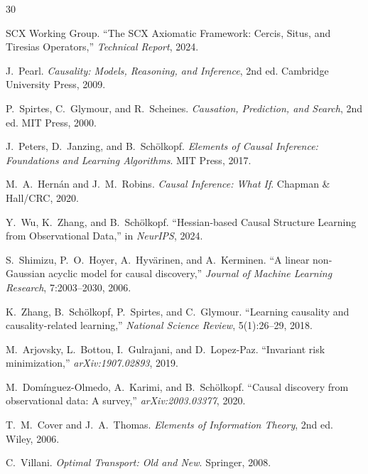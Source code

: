 \documentclass[12pt,a4paper]{article}
\begin{document}

\begin{thebibliography}{30}

SCX Working Group.
\newblock ``The SCX Axiomatic Framework: Cercis, Situs, and Tiresias
Operators,''
\newblock \emph{Technical Report}, 2024.

J.~Pearl.
\newblock \emph{Causality: Models, Reasoning, and Inference}, 2nd ed.
\newblock Cambridge University Press, 2009.

P.~Spirtes, C.~Glymour, and R.~Scheines.
\newblock \emph{Causation, Prediction, and Search}, 2nd ed.
\newblock MIT Press, 2000.

J.~Peters, D.~Janzing, and B.~Sch\"olkopf.
\newblock \emph{Elements of Causal Inference: Foundations and Learning
Algorithms}.
\newblock MIT Press, 2017.

M.~A.~Hern\'an and J.~M.~Robins.
\newblock \emph{Causal Inference: What If}.
\newblock Chapman \& Hall/CRC, 2020.

Y.~Wu, K.~Zhang, and B.~Sch\"olkopf.
\newblock ``Hessian-based Causal Structure Learning from Observational Data,''
\newblock in \emph{NeurIPS}, 2024.

S.~Shimizu, P.~O.~Hoyer, A.~Hyv\"arinen, and A.~Kerminen.
\newblock ``A linear non-Gaussian acyclic model for causal discovery,''
\newblock \emph{Journal of Machine Learning Research}, 7:2003--2030, 2006.

K.~Zhang, B.~Sch\"olkopf, P.~Spirtes, and C.~Glymour.
\newblock ``Learning causality and causality-related learning,''
\newblock \emph{National Science Review}, 5(1):26--29, 2018.

M.~Arjovsky, L.~Bottou, I.~Gulrajani, and D.~Lopez-Paz.
\newblock ``Invariant risk minimization,''
\newblock \emph{arXiv:1907.02893}, 2019.

M.~Dom\'inguez-Olmedo, A.~Karimi, and B.~Sch\"olkopf.
\newblock ``Causal discovery from observational data: A survey,''
\newblock \emph{arXiv:2003.03377}, 2020.

T.~M.~Cover and J.~A.~Thomas.
\newblock \emph{Elements of Information Theory}, 2nd ed.
\newblock Wiley, 2006.

C.~Villani.
\newblock \emph{Optimal Transport: Old and New}.
\newblock Springer, 2008.

\end{thebibliography}
\end{document}
